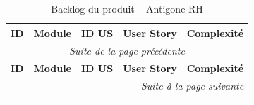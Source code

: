 
\begin{longtable}{|c|c|c|p{7.2cm}|c|}
\caption{Backlog du produit -- Antigone RH} \label{tab:backlog-antigone-rh} \\
\hline
\textbf{ID} & \textbf{Module} & \textbf{ID US} & \textbf{User Story} & \textbf{Complexité} \\
\hline
\endfirsthead

\multicolumn{5}{c}{\textit{Suite de la page précédente}} \\
\hline
\textbf{ID} & \textbf{Module} & \textbf{ID US} & \textbf{User Story} & \textbf{Complexité} \\
\hline
\endhead

\hline \multicolumn{5}{r}{\textit{Suite à la page suivante}} \\
\endfoot

\hline
\endlastfoot


\end{longtable}
